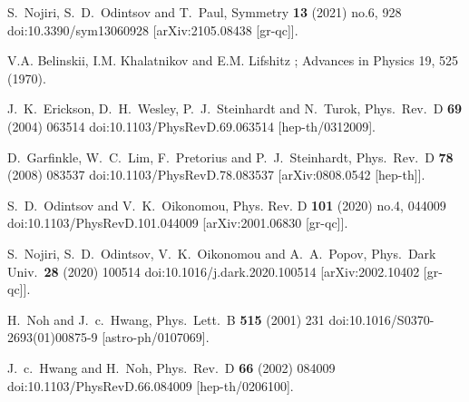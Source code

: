\documentclass{article}
\begin{document}
\begin{thebibliography}{99}
S.~Nojiri, S.~D.~Odintsov and T.~Paul,
Symmetry \textbf{13} (2021) no.6, 928
doi:10.3390/sym13060928
[arXiv:2105.08438 [gr-qc]].


V.A. Belinskii, I.M. Khalatnikov and E.M. Lifshitz ; Advances in Physics 19, 525 (1970).

  J.~K.~Erickson, D.~H.~Wesley, P.~J.~Steinhardt and N.~Turok,
  Phys.\ Rev.\ D {\bf 69} (2004) 063514
  doi:10.1103/PhysRevD.69.063514
  [hep-th/0312009].
  
  
  
  D.~Garfinkle, W.~C.~Lim, F.~Pretorius and P.~J.~Steinhardt,
  Phys.\ Rev.\ D {\bf 78} (2008) 083537
  doi:10.1103/PhysRevD.78.083537
  [arXiv:0808.0542 [hep-th]].
  
  

S.~D.~Odintsov and V.~K.~Oikonomou,
Phys. Rev. D \textbf{101} (2020) no.4, 044009
doi:10.1103/PhysRevD.101.044009
[arXiv:2001.06830 [gr-qc]].

  S.~Nojiri, S.~D.~Odintsov, V.~K.~Oikonomou and A.~A.~Popov,
  Phys.\ Dark Univ.\  {\bf 28} (2020) 100514
  doi:10.1016/j.dark.2020.100514
  [arXiv:2002.10402 [gr-qc]].


H.~Noh and J.~c.~Hwang,
Phys.\ Lett.\ B {\bf 515} (2001) 231
doi:10.1016/S0370-2693(01)00875-9
[astro-ph/0107069].


J.~c.~Hwang and H.~Noh,
Phys.\ Rev.\ D {\bf 66} (2002) 084009
doi:10.1103/PhysRevD.66.084009
[hep-th/0206100].




\end{thebibliography}
\end{document}
